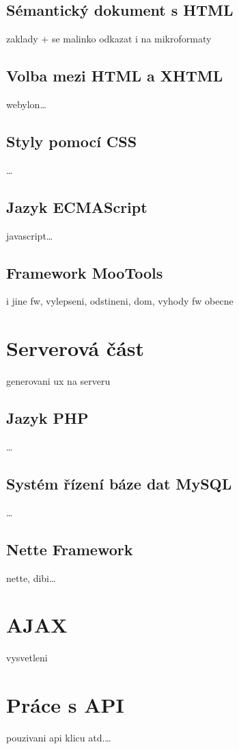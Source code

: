 \subsection{Sémantický dokument s HTML}
zaklady + se malinko odkazat i na mikroformaty

\subsection{Volba mezi HTML a XHTML}
webylon\ldots

\subsection{Styly pomocí CSS}
\ldots

\subsection{Jazyk ECMAScript}
javascript\ldots

\subsection{Framework MooTools}
i jine fw, vylepseni, odstineni, dom, vyhody fw obecne

\section{Serverová část}
generovani ux na serveru
\subsection{Jazyk PHP}
\ldots
\subsection{Systém řízení báze dat MySQL}
\ldots
\subsection{Nette Framework}
nette, dibi\ldots

\section{AJAX}
vysvetleni

\section{Práce s API}
pouzivani api klicu atd.\ldots
